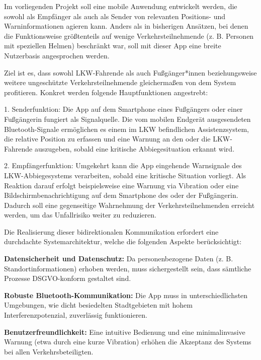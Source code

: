 \documentclass[a4paper, 12pt]{article} %
\begin{document}
\begin{spacing}{1.8}  %
\fontsize{14pt}{15pt}\selectfont  %

 
Im vorliegenden Projekt soll eine mobile Anwendung entwickelt werden, die sowohl als Empfänger als auch als Sender von relevanten Positions- und Warninformationen agieren kann. Anders als in bisherigen Ansätzen, bei denen die Funktionsweise größtenteils auf wenige Verkehrsteilnehmende (z. B. Personen mit speziellen Helmen) beschränkt war, soll mit dieser App eine breite Nutzerbasis angesprochen werden.  

Ziel ist es, dass sowohl LKW-Fahrende als auch Fußgänger*innen beziehungsweise weitere ungeschützte Verkehrsteilnehmende gleichermaßen von dem System profitieren. Konkret werden folgende Hauptfunktionen angestrebt:

1. Senderfunktion: 
   Die App auf dem Smartphone eines Fußgängers oder einer Fußgängerin fungiert als Signalquelle. Die vom mobilen Endgerät ausgesendeten Bluetooth-Signale ermöglichen es einem im LKW befindlichen Assistenzsystem, die relative Position zu erfassen und eine Warnung an den oder die LKW-Fahrende auszugeben, sobald eine kritische Abbiegesituation erkannt wird.

2. Empfängerfunktion:  
   Umgekehrt kann die App eingehende Warnsignale des LKW-Abbiegesystems verarbeiten, sobald eine kritische Situation vorliegt. Als Reaktion darauf erfolgt beispielsweise eine Warnung via Vibration oder eine Bildschirmbenachrichtigung auf dem Smartphone des oder der Fußgänger\*in. Dadurch soll eine gegenseitige Wahrnehmung der Verkehrsteilnehmenden erreicht werden, um das Unfallrisiko weiter zu reduzieren.

Die Realisierung dieser bidirektionalen Kommunikation erfordert eine durchdachte Systemarchitektur, welche die folgenden Aspekte berücksichtigt:

\textbf{Datensicherheit und Datenschutz:}  Da personenbezogene Daten (z. B. Standortinformationen) erhoben werden, muss sichergestellt sein, dass sämtliche Prozesse DSGVO-konform gestaltet sind\Cite{dsgvo_gesetz}.  

\textbf{Robuste Bluetooth-Kommunikation:}  Die App muss in unterschiedlichsten Umgebungen, wie dicht besiedelten Stadtgebieten mit hohem Interferenzpotenzial, zuverlässig funktionieren.  

\textbf{Benutzerfreundlichkeit:}  Eine intuitive Bedienung und eine minimalinvasive Warnung (etwa durch eine kurze Vibration) erhöhen die Akzeptanz des Systems bei allen Verkehrsbeteiligten.  


\end{spacing}
\end{document}
